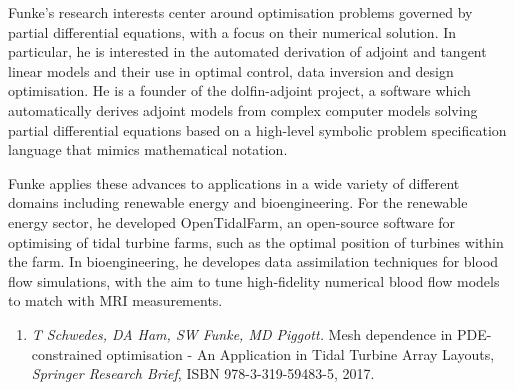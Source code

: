 \documentclass[11pt]{article}
\begin{document}

Funke's research interests center around optimisation problems governed by
partial differential equations, with a focus on their numerical solution. In
particular, he is interested in the automated derivation of adjoint and tangent
linear models and their use in optimal control, data inversion and design optimisation.
He is a founder of the dolfin-adjoint project, a software which automatically
derives adjoint models from complex computer models solving partial
differential equations based on a high-level symbolic problem specification
language that mimics mathematical notation.

Funke applies these advances to applications in a wide variety of different
domains including renewable energy and bioengineering. For the renewable energy
sector, he developed OpenTidalFarm, an open-source software for optimising of
tidal turbine farms, such as the optimal position of turbines within the farm.
In bioengineering, he developes data assimilation techniques for blood flow
simulations, with the aim to tune high-fidelity numerical blood flow models to
match with MRI measurements.

{}
\begin{enumerate}
    \item \textit{T Schwedes, DA Ham, SW Funke,  MD Piggott.} Mesh dependence in PDE-constrained optimisation - An Application in Tidal Turbine Array Layouts, \textit{Springer Research Brief}, ISBN 978-3-319-59483-5, 2017.
\end{enumerate}
\end{document}
